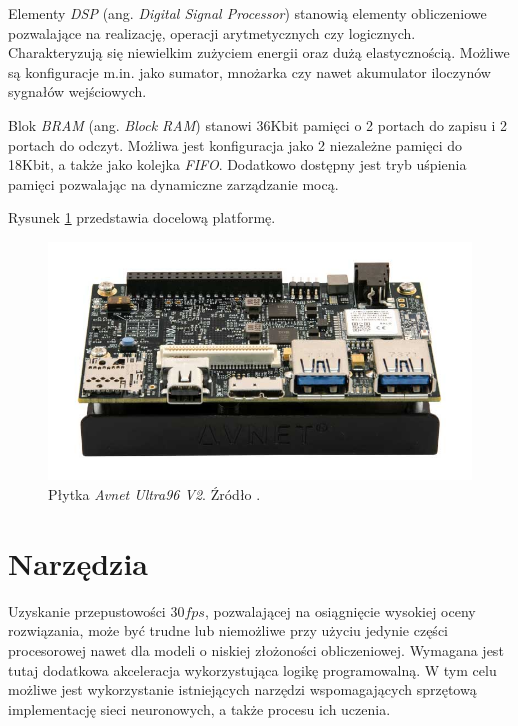 Elementy \emph{DSP} (ang. \emph{Digital Signal Processor}) \cite{dsp} stanowią elementy obliczeniowe pozwalające na realizację, operacji arytmetycznych czy logicznych.
Charakteryzują się niewielkim zużyciem energii oraz dużą elastycznością.
Możliwe są konfiguracje m.in. jako sumator, mnożarka czy nawet akumulator iloczynów sygnałów wejściowych.

Blok \emph{BRAM} (ang. \emph{Block RAM}) \cite{bram} stanowi 36Kbit pamięci o 2 portach do zapisu i 2 portach do odczyt. 
Możliwa jest konfiguracja jako 2 niezależne pamięci do 18Kbit, a także jako kolejka \emph{FIFO}.
Dodatkowo dostępny jest tryb uśpienia pamięci pozwalając na dynamiczne zarządzanie mocą. 

Rysunek \ref{fig:ultra96} przedstawia docelową platformę.

\begin{figure}
    \centering
    \includegraphics[width=\linewidth]{images/ultra96v2.png}
    \caption{Płytka \emph{Avnet Ultra96 V2}. Źródło \cite{avnet_ultra96}.}
    \label{fig:ultra96}
\end{figure}

\section{Narzędzia}
Uzyskanie przepustowości $30 fps$, pozwalającej na osiągnięcie wysokiej oceny rozwiązania, może być trudne lub niemożliwe  przy użyciu jedynie części procesorowej nawet dla modeli o niskiej złożoności obliczeniowej. 
Wymagana jest tutaj dodatkowa akceleracja wykorzystująca logikę programowalną. 
W tym celu możliwe jest wykorzystanie istniejących narzędzi wspomagających sprzętową implementację sieci neuronowych, a także procesu ich uczenia. 

